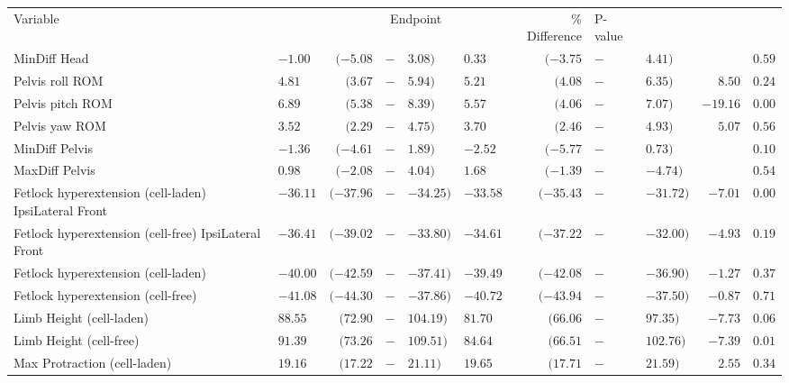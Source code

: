 \documentclass[twocolumn, serif, empirical, authordate, seplic]{jote-article}
\begin{document}
\begin{table}[ht!] \sffamily
\begin{tabularx}{\linewidth}{>{\raggedright}p{}>{\raggedleft\arraybackslash}Xrp{}l>{\raggedleft\arraybackslash}Xrp{}lrr}   \multicolumn{11}{c}{\cellcolor[HTML]{ffffff}}\\[-2ex]
\toprule Variable & \multicolumn{4}{c}{Baseline} & \multicolumn{4}{c}{Endpoint}  & \% Difference & P-value\tabularnewline \midrule  
MinDiff Head & $  -1.00$ & $ (-5.08$ & $-$ & $3.08)  $& $  0.33$ & $ (-3.75$ & $-$ & $4.41)  $& & $  0.59  $\tabularnewline Pelvis roll ROM & $ 4.81$ & $ (3.67$ & $-$ & $5.94)  $& $ 5.21$ & $ (4.08$ & $-$ & $6.35)  $&$  8.50 $& $  0.24  $ \tabularnewline
Pelvis pitch ROM &  $\mathbf{ 6.89}$ & $\mathbf{ (5.38}$ & $\mathbf{-}$ & $\mathbf{8.39)  }$& $\mathbf{ 5.57}$ & $\mathbf{ (4.06}$ & $\mathbf{-}$ & $\mathbf{7.07)  }$& $\mathbf{  -19.16 }$ & $\mathbf{  0.00  }$ \tabularnewline 
Pelvis yaw ROM & $ 3.52$ & $ (2.29$ & $-$ & $4.75)  $& $ 3.70$ & $ (2.46$ & $-$ & $4.93)  $& $  5.07 $& $  0.56  $\tabularnewline 
MinDiff Pelvis & $  -1.36$ & $ (-4.61$ & $-$ & $1.89)  $& $  -2.52$ & $ (-5.77$ & $-$ & $0.73)  $& &$  0.10  $\tabularnewline MaxDiff Pelvis & $ 0.98$ & $ (-2.08$ & $-$ & $4.04)  $& $ 1.68$ & $ (-1.39$ & $-$ & $-4.74)  $& &$  0.54  $\tabularnewline
Fetlock hyperextension (cell-laden)  IpsiLateral Front & $  -36.11$ & $ (-37.96$ & $-$ & $-34.25)  $& $  -33.58$ & $ (-35.43$ & $-$ & $-31.72)  $& $  -7.01 $& $  0.00  $\tabularnewline
Fetlock hyperextension (cell-free) IpsiLateral Front & $\mathbf{  -36.41}$ & $\mathbf{ (-39.02}$ & $\mathbf{-}$ & $\mathbf{-33.80)  }$& $\mathbf{  -34.61}$ & $\mathbf{ (-37.22}$ & $\mathbf{-}$ & $\mathbf{-32.00)  }$& $\mathbf{  -4.93 }$& $\mathbf{  0.19  }$\tabularnewline
Fetlock hyperextension (cell-laden) & $  -40.00$ & $ (-42.59$ & $-$ & $-37.41)  $& $  -39.49$ & $ (-42.08$ & $-$ & $-36.90) $& $  -1.27 $ & $  0.37  $\tabularnewline
Fetlock hyperextension (cell-free) & $  -41.08$ & $ (-44.30$ & $-$ & $-37.86)  $& $  -40.72$ & $ (-43.94$ & $-$ & $-37.50)  $& $  -0.87 $& $  0.71  $\tabularnewline
Limb Height (cell-laden) & $ 88.55$ & $ (72.90$ & $-$ & $104.19)  $& $ 81.70$ & $ (66.06$ & $-$ & $97.35)  $& $  -7.73 $& $  0.06  $\tabularnewline
Limb Height (cell-free) & $\mathbf{ 91.39}$ & $\mathbf{ (73.26}$ & $\mathbf{-}$ & $\mathbf{109.51)  }$& $\mathbf{ 84.64}$ & $\mathbf{ (66.51}$ & $\mathbf{-}$ & $\mathbf{102.76)  }$& $\mathbf{  -7.39 }$& $\mathbf{  0.01  }$\tabularnewline
Max Protraction (cell-laden) & $ 19.16$ & $ (17.22$ & $-$ & $21.11)  $& $ 19.65$ & $ (17.71$ & $-$ & $21.59)  $& $  2.55 $& $  0.34  $\tabularnewline 

\end{tabularx}
\end{table}
\end{document}
